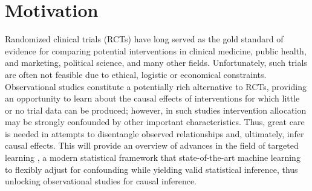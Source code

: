 \documentclass[a4paper,11pt]{texMemo}
\newcommand{\note}[2][]{\added[#1,remark={#2}]{}}
\begin{document}
\section{Motivation}

Randomized clinical trials (RCTs) have long served as the gold standard of evidence for comparing potential interventions in clinical medicine, public health, and marketing, political science, and many other fields. Unfortunately, such trials are often not feasible due to ethical, logistic or economical constraints. Observational studies constitute a potentially rich alternative to RCTs, providing an opportunity to learn about the causal effects of interventions for which little or no trial data can be produced; however, in such studies intervention allocation may be strongly confounded by other important characteristics. Thus, great care is needed in attempts to disentangle observed relationships and, ultimately, infer causal effects. This   will provide an overview of  advances in the field of targeted learning \note[id=RP]{in the abstract, this workshop was intended to provide a comprehensive introduction to TL. Here, it is intended to provide an "overview of advances" in TL. This is contradictory and we need to choose one focus/target audience. I vote for the "comprehensive introduction" and a target audience of advanced epidemiologists who are grateful for the software and might already use existing TL software in R but not fantastic programmers/statisticians}, a modern statistical framework that   state-of-the-art
machine learning to flexibly adjust for confounding while yielding  valid statistical inference, thus unlocking observational studies for causal inference.
\end{document}
